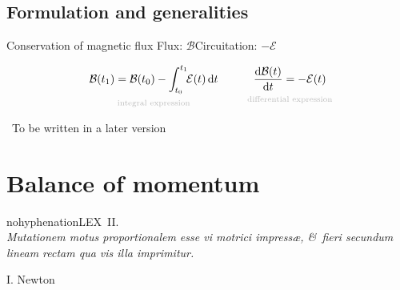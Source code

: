 \documentclass[a4paper,12pt,%
onecolumn,oneside,%
british%
]{memoir}
\newcommand{\langnohyph}[1]{\begin{hyphenrules}{nohyphenation}#1\end{hyphenrules}}
\newcommand*{\amp}{\&}
\newcommand{\mynotew}[1]{{\footnotesize\color{midgrey}\faIcon{tools}\ #1}}
\newcommand*{\di}{\mathop{}\!\mathrm{d}}%
\renewcommand*{\|}[1][]{\nonscript\:#1\vert\nonscript\:\mathopen{}}
\newcommand*{\yti}{t_{0}}
\newcommand*{\ytf}{t_{1}}
\newcommand*{\dt}{\di t}
\newcommand*{\yBf}{\mathcal{B}}
\newcommand*{\yEv}{\mathcal{E}}
\begin{document}
\section{Formulation and generalities}
\label{sec:cons_magneticflux_formulation}

\begin{definition}{Conservation of magnetic flux}
  Flux: $\yBf$\qquad Circuitation: $-\yEv$

  \begin{equation}
    \label{eq:cons_magneticflux}
    \underbracket[0pt]{\yBf(\ytf) =
      \yBf(\yti) -
      \int_{\yti}^{\ytf}\!\!\yEv(t)\dt}_{\mathclap{\text{\color{grey}integral expression}}}
      \qquad\quad
      \underbracket[0pt]{\frac{\di\yBf(t)}{\dt} =
        -\yEv(t)}_{\mathclap{\text{\color{grey}differential expression}}}
  \end{equation}
\end{definition}

\mynotew{To be written in a later version}


\printpagenotes*
\cleartooddpage
\chapter{Balance of momentum}
\label{cha:bal_momentum}


\epigraph{
\langnohyph{LEX~II.\\
\emph{Mutationem motus proportionalem esse vi motrici impress\ae, \amp\ fieri secundum lineam rectam qua vis illa imprimitur.}}}{I. Newton \cites*{newton1687}}
\end{document}
